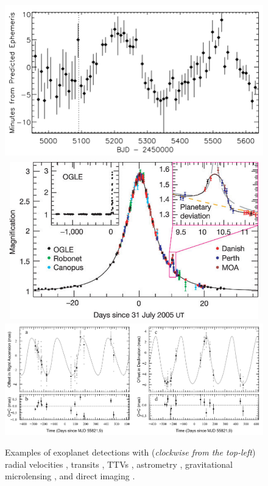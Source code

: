 \begin{figure}
\includegraphics[scale=.22]{figures/kepler19bTTV.png}
\includegraphics[scale=.2]{figures/ogle.png}
\includegraphics[scale=.24]{figures/de082349astrometry.png}
\caption{Examples of exoplanet detections with (\emph{clockwise from the 
top-left}) radial velocities \parencite{mayor95}, transits 
\parencite{charbonneau09}, TTVs \parencite{ballard11}, astrometry 
\parencite{sahlmann13}, gravitational microlensing \parencite{beaulieu06}, and 
direct imaging \parencite{currie14}. \label{fig:detection}}
\end{figure}

